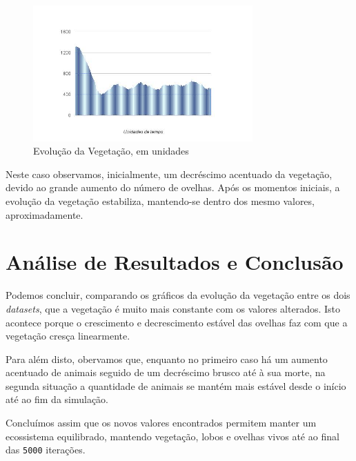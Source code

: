 \documentclass[12pt]{article}
\begin{document}
\begin{figure}[H]
  \centering
  \includegraphics[width=0.75\textwidth]{vegetacao2}
  \caption{Evolução da Vegetação, em unidades}
\end{figure}

Neste caso observamos, inicialmente, um decréscimo acentuado da vegetação, devido ao grande aumento do número de ovelhas. Após os momentos iniciais, a evolução da vegetação estabiliza, mantendo-se dentro dos mesmo valores, aproximadamente.

\section*{Análise de Resultados e Conclusão}

Podemos concluir, comparando os gráficos da evolução da vegetação entre os dois
\textit{datasets}, que a vegetação é muito mais constante com os valores alterados.
Isto acontece porque o crescimento e decrescimento estável das ovelhas faz com que a vegetação cresça linearmente.

Para além disto, obervamos que, enquanto no primeiro caso há um aumento acentuado de animais seguido de um decréscimo brusco até à sua morte, na segunda situação a quantidade de animais se mantém mais estável desde o início até ao fim da simulação.

Concluímos assim que os novos valores encontrados permitem manter um ecossistema equilibrado, mantendo vegetação, lobos e ovelhas vivos até ao final das \texttt{5000} iterações.
\end{document}
